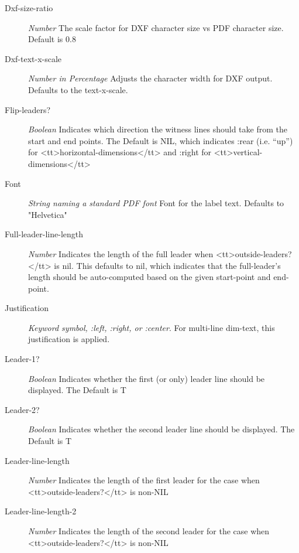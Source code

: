 \documentclass [11pt]{book}
\begin{document}
\begin{itemize}
\begin{description}
\item [Dxf-size-ratio]
\emph{Number} The scale factor for DXF character size vs PDF character size. Default is 0.8


\item [Dxf-text-x-scale]
\emph{Number in Percentage} Adjusts the character width for DXF output. Defaults to the text-x-scale.


\item [Flip-leaders?]
\emph{Boolean} Indicates which direction the witness lines should take from the start and end points. The Default is NIL,
which indicates :rear (i.e. ``up'') for <tt>horizontal-dimensions</tt> and :right for <tt>vertical-dimensions</tt>


\item [Font]
\emph{String naming a standard PDF font} Font for the label text. Defaults to "Helvetica"


\item [Full-leader-line-length]
\emph{Number} Indicates the length of the full leader when <tt>outside-leaders?</tt> is nil. This defaults to nil,
which indicates that the full-leader's length should be auto-computed based on the given start-point and end-point.


\item [Justification]
\emph{Keyword symbol, :left, :right, or :center}.
For multi-line dim-text, this justification is applied.


\item [Leader-1?]
\emph{Boolean} Indicates whether the first (or only) leader line should be displayed. The Default is T


\item [Leader-2?]
\emph{Boolean} Indicates whether the second leader line should be displayed. The Default is T


\item [Leader-line-length]
\emph{Number} Indicates the length of the first leader for the case when <tt>outside-leaders?</tt> is non-NIL


\item [Leader-line-length-2]
\emph{Number} Indicates the length of the second leader for the case when <tt>outside-leaders?</tt> is non-NIL



\end{description}
\end{itemize}
\end{document}
